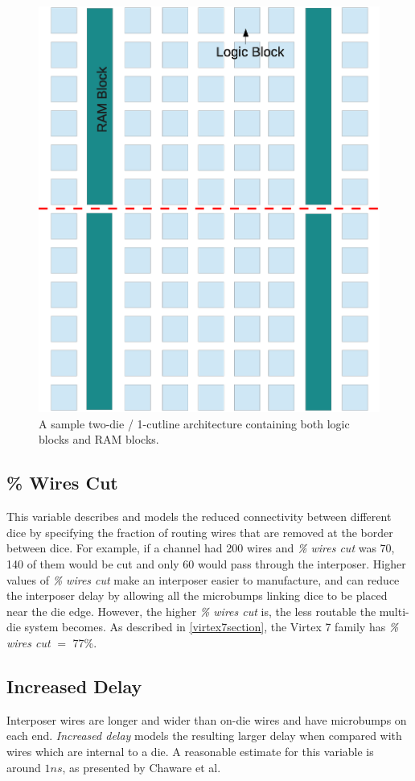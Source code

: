 \documentclass[journal]{IEEEtran}
\begin{document}
\begin{figure}[!htbp]
\centering
\includegraphics[width=0.65\linewidth]{fpga.eps}
\caption{A sample two-die / 1-cutline architecture containing both logic blocks and RAM blocks.}
\label{fig:fpga}
\end{figure}

\subsection{\% Wires Cut}
This variable describes and models the reduced connectivity between different dice by specifying the fraction of routing wires that are removed at the border between dice. For example, if a channel had 200 wires and \textit{\% wires cut} was 70, 140 of them would be cut and only 60 would pass through the interposer. Higher values of \textit{\% wires cut} make an interposer easier to manufacture, and can reduce the interposer delay by allowing all the microbumps linking dice to be placed near the die edge. However, the higher \textit{\% wires cut} is, the less routable the multi-die system becomes. As described in \ref{virtex7section}, the Virtex 7 family has \textit{\% wires cut} $=$ 77\%.

\subsection{Increased Delay}
Interposer wires are longer and wider than on-die wires and have microbumps on each end. \textit{Increased delay} models the resulting larger delay when compared with wires which are internal to a die. A reasonable estimate for this variable is around $1ns$, as presented by Chaware et al\cite{xilinxTSV}.
\end{document}
